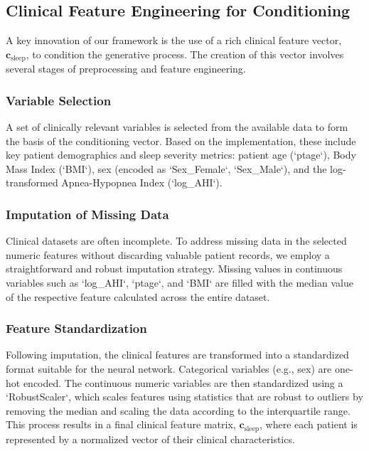 \documentclass[10pt, conference]{IEEEtran}
\begin{document}
\subsection{Clinical Feature Engineering for Conditioning}
A key innovation of our framework is the use of a rich clinical feature vector, $\mathbf{c}_{\text{sleep}}$, to condition the generative process. The creation of this vector involves several stages of preprocessing and feature engineering.

\subsubsection{Variable Selection}
A set of clinically relevant variables is selected from the available data to form the basis of the conditioning vector. Based on the implementation, these include key patient demographics and sleep severity metrics: patient age (`ptage`), Body Mass Index (`BMI`), sex (encoded as `Sex_Female`, `Sex_Male`), and the log-transformed Apnea-Hypopnea Index (`log_AHI`).

\subsubsection{Imputation of Missing Data}
Clinical datasets are often incomplete. To address missing data in the selected numeric features without discarding valuable patient records, we employ a straightforward and robust imputation strategy. Missing values in continuous variables such as `log_AHI`, `ptage`, and `BMI` are filled with the median value of the respective feature calculated across the entire dataset.

\subsubsection{Feature Standardization}
Following imputation, the clinical features are transformed into a standardized format suitable for the neural network. Categorical variables (e.g., sex) are one-hot encoded. The continuous numeric variables are then standardized using a `RobustScaler`, which scales features using statistics that are robust to outliers by removing the median and scaling the data according to the interquartile range. This process results in a final clinical feature matrix, $\mathbf{c}_{\text{sleep}}$, where each patient is represented by a normalized vector of their clinical characteristics.
\end{document}
